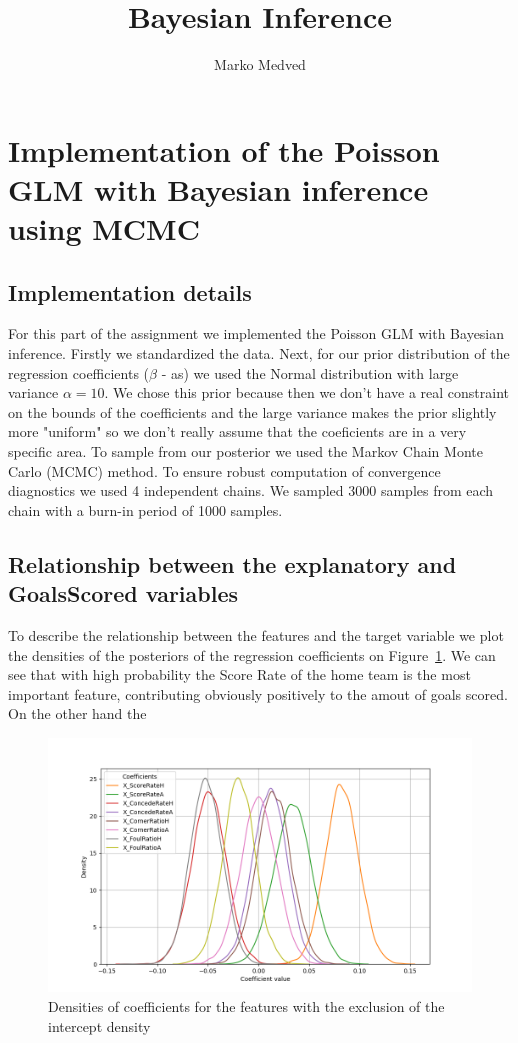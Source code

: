 \documentclass[9pt]{IEEEtran}
\title{\vspace{0ex}
Bayesian Inference}
\author{Marko Medved\vspace{-4.0ex}}
\begin{document}
\maketitle

\section{Implementation of the Poisson GLM with Bayesian inference using MCMC}

\subsection{Implementation details}

For this part of the assignment we implemented the Poisson GLM with Bayesian 
inference. Firstly we standardized the data. Next, for 
our prior distribution of the regression coefficients ($\beta$ - as) we used 
the Normal distribution with large variance $\alpha = 10$. We chose this prior 
because then we don't have a real constraint on the bounds of the coefficients and 
the large variance makes the prior slightly more "uniform" so we don't really assume
that the coeficients are in a very specific area. To sample from our posterior 
we used the Markov Chain Monte Carlo (MCMC) method. To ensure robust computation 
of convergence diagnostics we used 4 independent chains. We sampled 3000 
samples from each chain with a burn-in period of 1000 samples. 

\subsection{Relationship between the explanatory and GoalsScored variables}
To describe the relationship between the features and the target variable we 
plot the densities of the posteriors of the regression coefficients on Figure~\ref{fig:densities}.
We can see that with high probability the Score Rate of the home team is the most 
important feature, contributing obviously positively to the amout of goals scored. 
On the other hand the 


\begin{figure}[h]
\centering
\includegraphics[width=1\columnwidth]{figures/densities.png}
\caption{Densities of coefficients for the features with the exclusion of the 
intercept density}
\label{fig:densities}
\end{figure}
\end{document}
